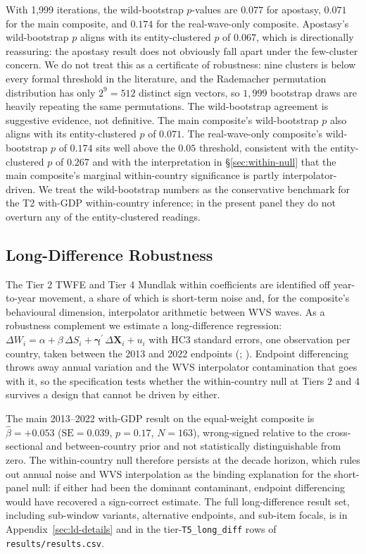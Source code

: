 \documentclass[12pt,a4paper]{article}
\begin{document}
With 1{,}999 iterations, the wild-bootstrap $p$-values are $0.077$ for apostasy, $0.071$ for the main composite, and $0.174$ for the real-wave-only composite. Apostasy's wild-bootstrap $p$ aligns with its entity-clustered $p$ of $0.067$, which is directionally reassuring: the apostasy result does not obviously fall apart under the few-cluster concern. We do not treat this as a certificate of robustness: nine clusters is below every formal threshold in the literature, and the Rademacher permutation distribution has only $2^9 = 512$ distinct sign vectors, so $1{,}999$ bootstrap draws are heavily repeating the same permutations. The wild-bootstrap agreement is suggestive evidence, not definitive. The main composite's wild-bootstrap $p$ also aligns with its entity-clustered $p$ of $0.071$. The real-wave-only composite's wild-bootstrap $p$ of $0.174$ sits well above the $0.05$ threshold, consistent with the entity-clustered $p$ of $0.267$ and with the interpretation in \S\ref{sec:within-null} that the main composite's marginal within-country significance is partly interpolator-driven. We treat the wild-bootstrap numbers as the conservative benchmark for the T2 with-GDP within-country inference; in the present panel they do not overturn any of the entity-clustered readings.

\subsection{Long-Difference Robustness}
\label{sec:longdiff}

The Tier 2 TWFE and Tier 4 Mundlak within coefficients are identified off year-to-year movement, a share of which is short-term noise and, for the composite's behavioural dimension, interpolator arithmetic between WVS waves. As a robustness complement we estimate a long-difference regression: $\Delta W_i = \alpha + \beta\,\Delta S_i + \boldsymbol{\gamma}^{\prime}\,\Delta\mathbf{X}_i + u_i$ with HC3 standard errors, one observation per country, taken between the 2013 and 2022 endpoints (\citealp{AcemogluJohnsonRobinsonYared2008}; \citealp{BesleyPersson2011}). Endpoint differencing throws away annual variation and the WVS interpolator contamination that goes with it, so the specification tests whether the within-country null at Tiers 2 and 4 survives a design that cannot be driven by either.

The main 2013--2022 with-GDP result on the equal-weight composite is $\hat{\beta} = +0.053$ ($\mathrm{SE} = 0.039$, $p = 0.17$, $N = 163$), wrong-signed relative to the cross-sectional and between-country prior and not statistically distinguishable from zero. The within-country null therefore persists at the decade horizon, which rules out annual noise and WVS interpolation as the binding explanation for the short-panel null: if either had been the dominant contaminant, endpoint differencing would have recovered a sign-correct estimate. The full long-difference result set, including sub-window variants, alternative endpoints, and sub-item focals, is in Appendix~\ref{sec:ld-details} and in the tier-\texttt{T5\_long\_diff} rows of \texttt{results/results.csv}.
\end{document}
